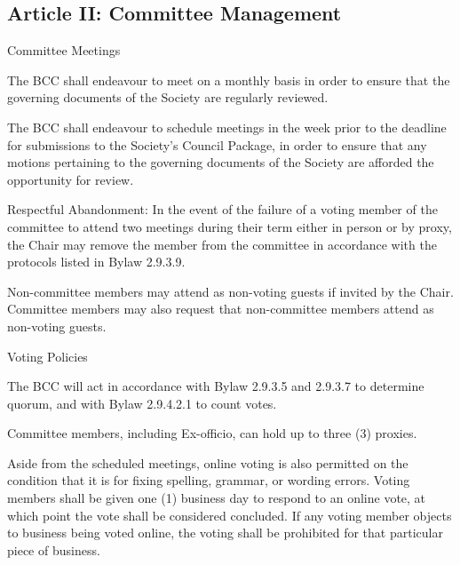 \subsection{Article II: Committee Management}
\begin{longenum}[ label*=\thesubsection.\arabic*., align=left] 
\item Committee Meetings
	\begin{longenum}[ label*=\arabic*., align=left] 
	\item The BCC shall endeavour to meet on a monthly basis in order to ensure that the governing documents of the Society are regularly reviewed.
	\item The BCC shall endeavour to schedule meetings in the week prior to the deadline for submissions to the Society's Council Package, in order to ensure that any motions pertaining to the governing documents of the Society are afforded the opportunity for review.
	\item Respectful Abandonment: In the event of the failure of a voting member of the committee to attend two meetings during their term either in person or by proxy, the Chair may remove the member from the committee in accordance with the protocols listed in Bylaw 2.9.3.9.
	\item Non-committee members may attend as non-voting guests if invited by the Chair. Committee members may also request that non-committee members attend as non-voting guests.
	\end{longenum}
\item Voting Policies
	\begin{longenum}[ label*=\arabic*., align=left] 
	\item The BCC  will act in accordance with Bylaw 2.9.3.5 and 2.9.3.7 to determine quorum, and with Bylaw 2.9.4.2.1 to count votes.
	\item Committee members, including Ex-officio, can hold up to three (3) proxies.
	\item Aside from the scheduled meetings, online voting is also permitted on the condition that it is for fixing spelling, grammar, or wording errors. Voting members shall be given one (1) business day to respond to an online vote, at which point the vote shall be considered concluded. If any voting member objects to business being voted online, the voting shall be prohibited for that particular piece of business.
	\end{longenum}
\end{longenum}

